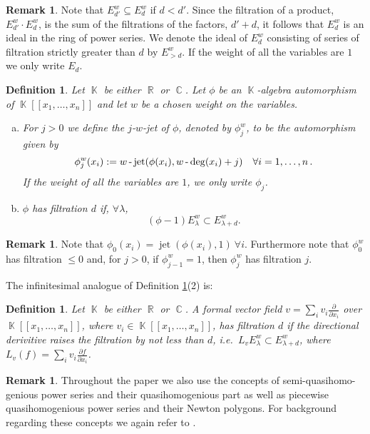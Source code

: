 \documentclass[noend]{amsproc}
\newtheorem{defn}[theorem]{Definition}
\theoremstyle{definition}
\newtheorem{remark}[theorem]{Remark}
\DeclareMathOperator{\R}{\mathbb{R}}
\DeclareMathOperator{\C}{\mathbb{C}}
\DeclareMathOperator{\K}{\mathbb{K}}
\DeclareMathOperator{\dash}{\textnormal{-}}
\DeclareMathOperator{\jet}{jet}
\begin{document}
\begin{remark}
Note that $E_{d'}^w\subseteq E_d^w$ if $d<d'$. Since the filtration of a product, $E_{d'}^w\cdot E_d^w$, is the sum of the filtrations of the factors, $d'+d$, it follows that $E_d^w$ is an ideal in the ring of power series. We denote the ideal of $E_d^w$ consisting of series of filtration strictly greater than $d$ by $E_{>d}^w$. If the weight of all the variables are $1$ we only write $E_d$. 
\end{remark}

\begin{defn}\label{phi}
Let $\K$ be either $\R$ or $\C$. Let $\phi$ be an $\K$-algebra automorphism of $\K[[x_1,\ldots,x_n]]$ and let $w$ be a chosen weight on the variables. 
\begin{enumerate}[(a)]
\item For $j > 0$ we define the
\emph{$j$-$w$-jet} of $\phi$, denoted by $\phi_j^w$, to be the automorphism given by
\[
\phi_j^w(x_i) := w\dash\jet(\phi(x_i),w\dash\deg(x_i)+j) \quad \forall i = 1,\ldots,n \,.
\]
If the weight of all the variables are $1$, we only write $\phi_j$.\\
\item $\phi$ has filtration $d$ if,  $\forall\lambda$,
\[(\phi-1)E_\lambda^w\subset E_{\lambda+d}^w.\]
\end{enumerate}
\end{defn}

\begin{remark}
Note that $\phi_0(x_i)=\jet(\phi(x_i),1)\ \forall i$. Furthermore note that $\phi_0^w$ has filtration $\le 0$ and, for $j>0$, if $\phi_{j-1}^w=1$, then $\phi_j^w$ has filtration $j$. 
\end{remark}

The infinitesimal analogue of Definition \ref{phi}(2) is:

\begin{defn}
Let $\K$ be either $\R$ or $\C$. A formal vector field $v=\sum_i v_i\frac{\partial}{\partial x_i}$ over $\K[[x_1,\ldots,x_n]]$, where $v_i\in\K[[x_1,\ldots,x_n]]$, has filtration $d$ if the directional derivitive raises the filtration by not less than $d$, i.e.~$L_vE^w_\lambda\subset E^w_{\lambda+d}$, where $L_v(f)=\sum_i v_i\frac{\partial f}{\partial x_i}$.
\end{defn}

\begin{remark}
Throughout the paper we also use the concepts of semi-quasihomo-genious power series and their quasihomogenious part as well as piecewise quasihomogenious power series and their Newton polygons. For background regarding these concepts we again refer to \cite{A1975}.
\end{remark}
\end{document}
